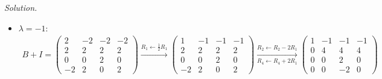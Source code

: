 \documentclass[12pt]{article}
\theoremstyle{definition}
\newenvironment{solution}{\par\noindent\textit{Solution.}\ }{\par\smallskip}
\begin{document}
\begin{solution}
\begin{itemize}
\[\begin{gathered}
\xrightarrow[R_4\leftarrow R_4-R_1]{R_2\leftarrow R_2+R_1}
\begin{pmatrix}-2&-2&-2&-2\\0&-4&0&0\\0&0&-2&0\\0&4&2&0\end{pmatrix}
\\
\xrightarrow{R_2\leftarrow-\frac14R_2}
\begin{pmatrix}-2&-2&-2&-2\\0&1&0&0\\0&0&-2&0\\0&4&2&0\end{pmatrix}
\xrightarrow[R_4\leftarrow R_4-4R_2]{R_1\leftarrow R_1+2R_2}
\begin{pmatrix}-2&0&-2&-2\\0&1&0&0\\0&0&-2&0\\0&0&2&0\end{pmatrix}
\\
\xrightarrow[R_4\leftarrow R_4+R_3]{R_1\leftarrow R_1-R_3}
\begin{pmatrix}-2&0&0&-2\\0&1&0&0\\0&0&-2&0\\0&0&0&0\end{pmatrix}
\xrightarrow[R_3\leftarrow-\frac12R_3]{R_1\leftarrow-\frac12R_1}
\begin{pmatrix}1&0&0&1\\0&1&0&0\\0&0&1&0\\0&0&0&0\end{pmatrix}
\end{gathered}
\]
The special solution \((-1,0,0,1)'\) is a basis of \(\mathcal N(B-3I)\).
\item \(\lambda=-1\):
\[
\begin{gathered}
B+I=\begin{pmatrix}2&-2&-2&-2\\2&2&2&2\\0&0&2&0\\-2&2&0&2\end{pmatrix}
\xrightarrow{R_1\leftarrow\frac12R_1}
\begin{pmatrix}1&-1&-1&-1\\2&2&2&2\\0&0&2&0\\-2&2&0&2\end{pmatrix}
\xrightarrow[R_4\leftarrow R_4+2R_1]{R_2\leftarrow R_2-2R_1}
\begin{pmatrix}1&-1&-1&-1\\0&4&4&4\\0&0&2&0\\0&0&-2&0\end{pmatrix}

\end{gathered}\]
\end{itemize}
\end{solution}
\end{document}
